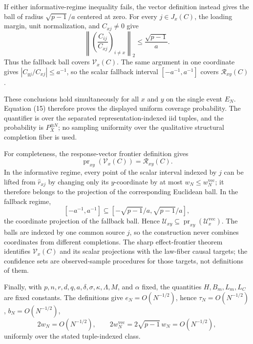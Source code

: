 If either informative-regime inequality fails, the vector definition instead gives the ball of radius \(\sqrt{p-1}/a\) centered at zero. For every \(j\in J_x(C)\), the loading margin, unit normalization, and \(C_{xj}\ne0\) give
\[
 \left\lVert
 \left(\frac{C_{ij}}{C_{xj}}\right)_{i\ne x}
 \right\rVert_2
 \le\frac{\sqrt{p-1}}a.
\]
Thus the fallback ball covers \(\mathcal V_x(C)\). The same argument in one coordinate gives \(|C_{yj}/C_{xj}|\le a^{-1}\), so the scalar fallback interval \([-a^{-1},a^{-1}]\) covers \(\mathcal R_{xy}(C)\).

These conclusions hold simultaneously for all \(x\) and \(y\) on the single event \(E_N\). Equation (15) therefore proves the displayed uniform coverage probability. The quantifier is over the separated representation-indexed iid tuples, and the probability is \(P_X^{\otimes N}\); no sampling uniformity over the qualitative structural completion fiber is used.

For completeness, the response-vector frontier definition gives
\[
 \operatorname{pr}_{xy}(\mathcal V_x(C))=\mathcal R_{xy}(C).
\]
In the informative regime, every point of the scalar interval indexed by \(j\) can be lifted from \(\widehat r_{xj}\) by changing only its \(y\)-coordinate by at most \(w_N\le w_N^{\mathrm{vec}}\); it therefore belongs to the projection of the corresponding Euclidean ball. In the fallback regime,
\[
 [-a^{-1},a^{-1}]
 \subseteq[-\sqrt{p-1}/a,\sqrt{p-1}/a],
\]
the coordinate projection of the fallback ball. Hence \(\mathcal U_{xy}\subseteq\operatorname{pr}_{xy}(\mathcal U_x^{\mathrm{vec}})\). The balls are indexed by one common source \(j\), so the construction never combines coordinates from different completions. The sharp effect-frontier theorem identifies \(\mathcal V_x(C)\) and its scalar projections with the law-fiber causal targets; the confidence sets are observed-sample procedures for those targets, not definitions of them.

Finally, with \(p,n,r,d,q,a,\delta,\sigma,\kappa,\Lambda,M\), and \(\alpha\) fixed, the quantities \(H,B_m,L_m,L_C\) are fixed constants. The definitions give \(e_N=O(N^{-1/2})\), hence \(\tau_N=O(N^{-1/2})\), \(b_N=O(N^{-1/2})\),
\[
 2w_N=O(N^{-1/2}),
 \qquad
 2w_N^{\mathrm{vec}}=2\sqrt{p-1}\,w_N=O(N^{-1/2}),
\]
uniformly over the stated tuple-indexed class.